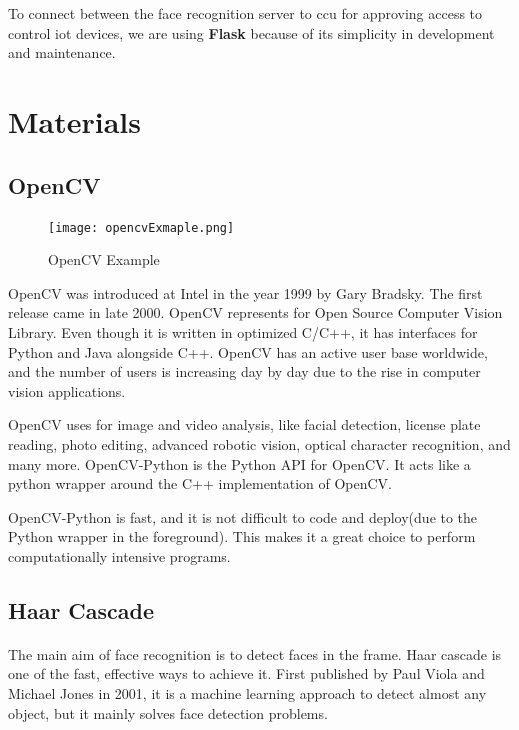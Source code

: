 To connect between the face recognition server to \acrlong{ccu} for approving access to control \acrshort{iot} devices, we are using \textbf{Flask} because of its simplicity in development and maintenance.

\section{Materials}

\subsection{OpenCV}
\paragraph{}

\begin{figure}[H]
    \centering
    \texttt{[image: opencvExmaple.png]}
    \caption{OpenCV Example}
\end{figure}

OpenCV was introduced at Intel in the year 1999 by Gary Bradsky. The first release came in late 2000. OpenCV represents for Open Source Computer Vision Library. Even though it is written in optimized C/C++, it has interfaces for Python and Java alongside C++. OpenCV has an active user base worldwide, and the number of users is increasing day by day due to the rise in computer vision applications.

OpenCV uses for image and video analysis, like facial detection, license plate reading, photo editing, advanced robotic vision, optical character recognition, and many more. OpenCV-Python is the Python API for OpenCV. It acts like a python wrapper around the C++ implementation of OpenCV.

OpenCV-Python is fast, and it is not difficult to code and deploy(due to the Python wrapper in the foreground). This makes it a great choice to perform computationally intensive programs. 

\subsection{Haar Cascade}
\paragraph{}
The main aim of face recognition is to detect faces in the frame. Haar cascade is one of the fast, effective ways to achieve it. First published by Paul Viola and Michael Jones\cite{haarcascade} in 2001, it is a machine learning approach to detect almost any object, but it mainly solves face detection problems. 

